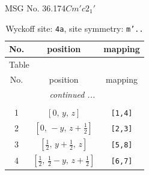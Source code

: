 \documentclass[fleqn,8pt]{jsarticle}
\begin{document}
\setcounter{MaxMatrixCols}{32}

\renewcommand{\tablename}{Table~}
\renewcommand{\figurename}{Figure~}
\begin{center}
\LARGE
MSG No. 36.174\quad$Cm'c2_{1}'$
\end{center}
\renewcommand{\arraystretch}{1.2}
\begin{longtable}{ccc}
\caption{Wyckoff site: {\tt 4a}, site symmetry: {\tt m'..}}
 \\
 \hline \hline
No. & position & mapping \\ \hline \endfirsthead

\multicolumn{2}{l}{\tablename\ \thetable{}} \\
 \hline \hline
No. & position & mapping \\ \hline \endhead

 \hline \hline
\multicolumn{2}{r}{\footnotesize\it continued ...} \\ \endfoot

 \hline \hline
\multicolumn{2}{r}{} \\ \endlastfoot

1 & $\left[ 0,\, y,\, z \right]$ & {\tt [1,4]} \\ \hline
2 & $\left[ 0,\, - y,\, z + \frac{1}{2} \right]$ & {\tt [2,3]} \\ \hline
3 & $\left[ \frac{1}{2},\, y + \frac{1}{2},\, z \right]$ & {\tt [5,8]} \\ \hline
4 & $\left[ \frac{1}{2},\, \frac{1}{2} - y,\, z + \frac{1}{2} \right]$ & {\tt [6,7]} \\
\end{longtable}
\renewcommand{\arraystretch}{1.2}
\end{document}
